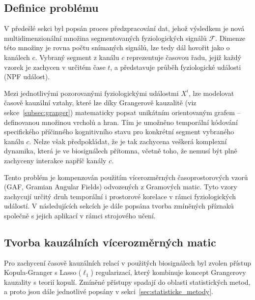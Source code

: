 \subsection{Definice problému}
\label{subsec:definice_problemu}
V předešlé sekci byl popsán proces předzpracování dat, jehož výsledkem je nová
multidimenzionální množina segmentovaných fyziologických signálů $\mathcal{F}$.
Dimenze této množiny je rovna počtu snímaných signálů, lze tedy dál hovořit jako
o kanálech $c$. Vybraný segment z kanálu $c$ reprezentuje časovou řadu, jejiž
každý vzorek je zachycen v určitém čase $t$, a představuje průběh fyziologické
události (\gls{NPF} událost).

Mezi jednotlivými pozorovanými fyziologickými událostmi $X^i$, lze modelovat
časově kauzální vztahy, které lze díky Grangerově kauzalitě (viz
sekce~\ref{subsec:granger}) matematicky popsat unikátním orientovaným grafem --
definovanou množinou vrcholů a hran. Tím je umožněno temporální kódování
specifického příčinného kognitivního stavu pro konkrétní segment vybraného
kanálu $c$. Nelze však předpokládat, že je tak zachycena veškerá komplexní
dynamika, která je ve biosignálech přítomna, včetně toho, že nemusí být plně
zachyceny interakce napříč kanály $c$.

Tento problém je kompenzován použitím vícerozměrných časoprostorových vzorů
(\gls{GAF}, Gramian Angular Fields) odvozených z Gramových matic. Tyto vzory
zachycují určitý druh temporální i prostorové korelace v rámci fyziologických
událostí. V následujících sekcích je dále popsána tvorba zmíněných příznaků
společně s jejich aplikací v rámci strojového učení.

\subsection{Tvorba kauzálních vícerozměrných matic}
\label{subsec:kauzalni_matice}
Pro zachycení časově kauzálních relací v použitých biosignálech byl zvolen
přístup Kopula-Granger s Lasso ($\ell_1$) regularizací, který kombinuje koncept
Grangerovy kauzality s teorií kopulí. Zmíněné přístupy spadají do oblasti
statistických metod, a proto jsou dále jednotlivé popsány v
sekci~\ref{sec:statisticke_metody}.

